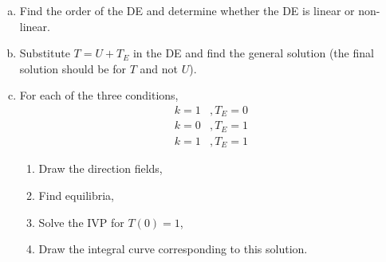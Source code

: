 	\begin{enumerate}[a)]
	\item Find the order of the DE and determine whether the DE is linear or non-linear.
	\item Substitute $ T = U + T _ E $ in the DE and find the general solution (the final solution should be for $ T $ and not $ U $).
	\item For each of the three conditions,
	\begin{align*}
		k = 1 &, T _ E = 0 \\
		k = 0 &, T _ E = 1 \\
		k = 1 &, T _ E = 1
		\end{align*}
		\begin{enumerate}[1)]
		\item Draw the direction fields,
		\item Find equilibria,
		\item Solve the IVP for $ T(0) = 1 $,
		\item Draw the integral curve corresponding to this solution.
		\end{enumerate}

	\end{enumerate}

















